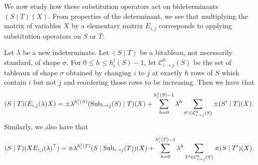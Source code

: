 \documentclass[letterpaper, 11pt]{amsart}
\begin{document}
We now study how these substitution operators act on bideterminants $(S \mid T)(X)$.
From properties of the determinant, we see that multiplying the matrix of variables $X$ by a elementary matrix $E_{i, j}$ corresponds to applying substitution operators on $S$ or $T$:
\begin{lem}\label{lem:Eij_left_mult}
    Let $\lambda$ be a new indeterminate.
    Let $(S \mid T)$ be a bitableau, not necessarily standard, of shape $\sigma$.
    For $0 \leq h \leq h_{i}^{j}(S) - 1$, let $\mathcal{C}^{h}_{i \to j}(S)$ be the set of tableaux of shape $\sigma$ obtained by changing $i$ to $j$ at exactly $h$ rows of $S$ which contain $i$ but not $j$ and reordering those rows to be increasing.
    Then we have that
    \begin{equation}\label{eq:Eij_left_mult}
        (S \mid T)(E_{i, j}(\lambda)X) = \pm \lambda^{h_{i}^{j}(S)} (\operatorname{Sub}_{i \to j}(S) \mid T)(X) + \sum_{h = 0}^{h_{i}^{j}(S) - 1} \lambda^h \sum_{S' \in \mathcal{C}^{h}_{i \to j}(S)} \pm  (S' \mid T)(X).
    \end{equation}
    Similarly, we also have that
    \begin{equation}\label{eq:Eij_right_mult}
        (S \mid T)(X E_{i, j}(\lambda)^{\top}) = \pm \lambda^{h_{i}^{j}(T)} (S \mid \operatorname{Sub}_{i \to j}(T))(X) + \sum_{h = 0}^{h_{i}^{j}(T) - 1} \lambda^h \sum_{T' \in \mathcal{C}^{h}_{i \to j}(T)} \pm (S \mid T')(X).
    \end{equation}
\end{lem}
\end{document}
